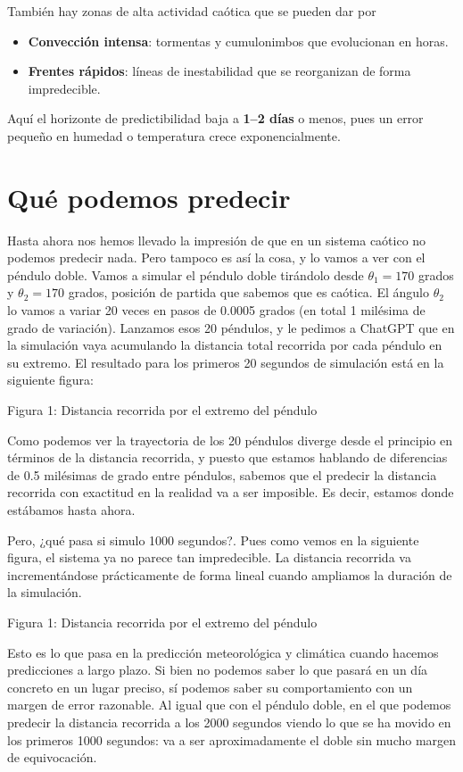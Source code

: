 \documentclass[
  11pt,
  a4paper,
  DIV=11,
  numbers=noendperiod]{scrreprt}
\providecommand{\tightlist}{%
  \setlength{\itemsep}{0pt}\setlength{\parskip}{0pt}}
\begin{document}
También hay zonas de alta actividad caótica que se pueden dar por

\begin{itemize}
\tightlist
\item
  \textbf{Convección intensa}: tormentas y cumulonimbos que evolucionan
  en horas.
\item
  \textbf{Frentes rápidos}: líneas de inestabilidad que se reorganizan
  de forma impredecible.
\end{itemize}

Aquí el horizonte de predictibilidad baja a \textbf{1--2 días} o menos,
pues un error pequeño en humedad o temperatura crece exponencialmente.

\chapter{Qué podemos predecir}\label{quuxe9-podemos-predecir}

Hasta ahora nos hemos llevado la impresión de que en un sistema caótico
no podemos predecir nada. Pero tampoco es así la cosa, y lo vamos a ver
con el péndulo doble. Vamos a simular el péndulo doble tirándolo desde
\(\theta_1=170\) grados y \(\theta_2=170\) grados, posición de partida
que sabemos que es caótica. El ángulo \(\theta_2\) lo vamos a variar 20
veces en pasos de 0.0005 grados (en total 1 milésima de grado de
variación). Lanzamos esos 20 péndulos, y le pedimos a ChatGPT que en la
simulación vaya acumulando la distancia total recorrida por cada péndulo
en su extremo. El resultado para los primeros 20 segundos de simulación
está en la siguiente figura:

Figura 1: Distancia recorrida por el extremo del péndulo

Como podemos ver la trayectoria de los 20 péndulos diverge desde el
principio en términos de la distancia recorrida, y puesto que estamos
hablando de diferencias de 0.5 milésimas de grado entre péndulos,
sabemos que el predecir la distancia recorrida con exactitud en la
realidad va a ser imposible. Es decir, estamos donde estábamos hasta
ahora.

Pero, ¿qué pasa si simulo 1000 segundos?. Pues como vemos en la
siguiente figura, el sistema ya no parece tan impredecible. La distancia
recorrida va incrementándose prácticamente de forma lineal cuando
ampliamos la duración de la simulación.

Figura 1: Distancia recorrida por el extremo del péndulo

Esto es lo que pasa en la predicción meteorológica y climática cuando
hacemos predicciones a largo plazo. Si bien no podemos saber lo que
pasará en un día concreto en un lugar preciso, sí podemos saber su
comportamiento con un margen de error razonable. Al igual que con el
péndulo doble, en el que podemos predecir la distancia recorrida a los
2000 segundos viendo lo que se ha movido en los primeros 1000 segundos:
va a ser aproximadamente el doble sin mucho margen de equivocación.
\end{document}
